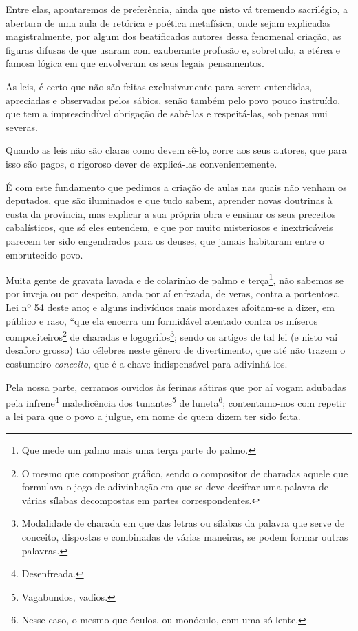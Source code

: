 Entre elas, apontaremos de preferência, ainda que nisto vá tremendo
sacrilégio, a abertura de uma aula de retórica e poética metafísica,
onde sejam explicadas magistralmente, por algum dos beatificados autores
dessa fenomenal criação, as figuras difusas de que usaram com exuberante
profusão e, sobretudo, a etérea e famosa lógica em que envolveram os
seus legais pensamentos.

As leis, é certo que não são feitas exclusivamente para serem
entendidas, apreciadas e observadas pelos sábios, senão também pelo povo
pouco instruído, que tem a imprescindível obrigação de sabê-las e
respeitá-las, sob penas mui severas.

Quando as leis não são claras como devem sê-lo, corre aos seus autores,
que para isso são pagos, o rigoroso dever de explicá-las
convenientemente.

É com este fundamento que pedimos a criação de aulas nas quais não
venham os deputados, que são iluminados e que tudo sabem, aprender novas
doutrinas à custa da província, mas explicar a sua própria obra e
ensinar os seus preceitos cabalísticos, que só eles entendem, e que por
muito misteriosos e inextricáveis parecem ter sido engendrados para os
deuses, que jamais habitaram entre o embrutecido povo.

Muita gente de gravata lavada e de colarinho de palmo e
terça\footnote{Que mede um palmo mais uma terça parte do palmo.}, não
sabemos se por inveja ou por despeito, anda por aí enfezada, de veras,
contra a portentosa Lei nº 54 deste ano; e alguns indivíduos mais
mordazes afoitam-se a dizer, em público e raso, ``que ela encerra um
formidável atentado contra os míseros compositeiros\footnote{O mesmo
  que compositor gráfico, sendo o compositor de charadas aquele que
  formulava o jogo de adivinhação em que se deve decifrar uma palavra de
  várias sílabas decompostas em partes correspondentes.} de charadas e
logogrifos\footnote{Modalidade de charada em que das letras ou sílabas
  da palavra que serve de conceito, dispostas e combinadas de várias
  maneiras, se podem formar outras palavras.}; sendo os artigos de tal
lei (e nisto vai desaforo grosso) tão célebres neste gênero de
divertimento, que até não trazem o costumeiro \emph{conceito}, que é a
chave indispensável para adivinhá-los.

Pela nossa parte, cerramos ouvidos às ferinas sátiras que por aí vogam
adubadas pela infrene\footnote{Desenfreada.} maledicência dos
tunantes\footnote{Vagabundos, vadios.} de luneta\footnote{Nesse
  caso, o mesmo que óculos, ou monóculo, com uma só lente.};
contentamo-nos com repetir a lei para que o povo a julgue, em nome de
quem dizem ter sido feita.

